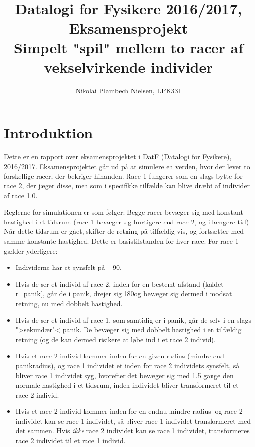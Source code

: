 \documentclass[a4paper,10pt]{article} 	%
\title{%
	Datalogi for Fysikere 2016/2017, Eksamensprojekt\\
	\large Simpelt "spil" mellem to racer af vekselvirkende individer}
\author{Nikolai Plambech Nielsen, LPK331}
\numberwithin{equation}{section}
\begin{document}
	
	\maketitle
	\newpage
	
	\section{Introduktion}
	Dette er en rapport over eksamensprojektet i DatF (Datalogi for Fysikere), 2016/2017. Eksamensprojektet går ud på at simulere en verden, hvor der lever to forskellige racer, der bekriger hinanden. Race 1 fungerer som en slags bytte for race 2, der jæger disse, men som i specifikke tilfælde kan blive dræbt af individer af race 1.0.
	
	Reglerne for simulationen er som følger: Begge racer bevæger sig med konstant hastighed i et tidsrum (race 1 bevæger sig hurtigere end race 2, og i længere tid). Når dette tidsrum er gået, skifter de retning på tilfældig vis, og fortsætter med samme konstante hastighed. Dette er basistilstanden for hver race. For race 1 gælder yderligere:
	\begin{itemize}
		\item Individerne har et synsfelt på $ \pm 90 $\Deg.
		\item Hvis de ser et individ af race 2, inden for en bestemt afstand (kaldet r\_panik), går de i panik, drejer sig 180\Deg og bevæger sig dermed i modsat retning, nu med dobbelt hastighed.
		\item Hvis de ser et individ af race 1, som samtidig er i panik, går de selv i en slags ">sekundær"< panik. De bevæger sig med dobbelt hastighed i en tilfældig retning (og de kan dermed risikere at løbe ind i et race 2 individ).
		\item Hvis et race 2 individ kommer inden for en given radius (mindre end panikradius), og race 1 individet et inden for race 2 individets synsfelt, så bliver race 1 individet syg, hvorefter det bevæger sig med 1.5 gange den normale hastighed i et tidsrum, inden individet bliver transformeret til et race 2 individ.
		\item Hvis et race 2 individ kommer inden for en endnu mindre radius, og race 2 individet kan se race 1 individet, så bliver race 1 individet transformeret med det sammen. Hvis \textit{ikke} race 2 individet kan se race 1 individet, transformeres race 2 individet til et race 1 individ.
	\end{itemize}
\end{document}
